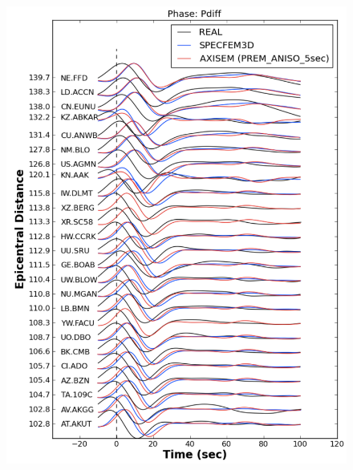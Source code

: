 \documentclass{article}
\begin{document}
\begin{figure}[H]
\centering
\begin{minipage}{.5\textwidth}
  \centering
  \includegraphics[width=0.9\linewidth]{AXISEMTutorial-fig010.pdf}


\end{minipage}
\end{figure}
\end{document}
